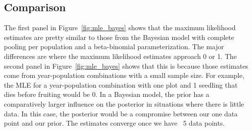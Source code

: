 \documentclass[12pt, oneside, titlepage]{article}   	%
\begin{document}

\subsection*{Comparison}

The first panel in Figure~\ref{fig:mle_bayes} shows that the maximum likelihood estimates are pretty similar to those from the Bayesian model with complete pooling per population and a beta-binomial parameterization. The major differences are where the maximum likelihood estimates approach 0 or 1. The second panel in Figure~\ref{fig:mle_bayes} shows that this is because those estimates come from year-population combinations with a small sample size. For example, the MLE for a year-population combination with one plot and 1 seedling that dies before fruiting would be 0. In a Bayesian model, the prior has a comparatively larger influence on the posterior in situations where there is little data. In this case, the posterior would be a compromise between our one data point and our prior. The estimates converge once we have ~5 data points.
\end{document}
